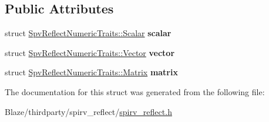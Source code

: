 \subsection*{Public Attributes}
\begin{DoxyCompactItemize}
\item 
\mbox{\label{structSpvReflectNumericTraits_aec2de7c5b32efafa9391e26ebab95ce9}} 
struct \hyperlink{structSpvReflectNumericTraits_1_1Scalar}{Spv\+Reflect\+Numeric\+Traits\+::\+Scalar} {\bfseries scalar}
\item 
\mbox{\label{structSpvReflectNumericTraits_a67f9618ed351699dc8de9e390ee36db1}} 
struct \hyperlink{structSpvReflectNumericTraits_1_1Vector}{Spv\+Reflect\+Numeric\+Traits\+::\+Vector} {\bfseries vector}
\item 
\mbox{\label{structSpvReflectNumericTraits_a1954087da355c8ec3dfe00ea0c4eebce}} 
struct \hyperlink{structSpvReflectNumericTraits_1_1Matrix}{Spv\+Reflect\+Numeric\+Traits\+::\+Matrix} {\bfseries matrix}
\end{DoxyCompactItemize}


The documentation for this struct was generated from the following file\+:\begin{DoxyCompactItemize}
\item 
Blaze/thirdparty/spirv\+\_\+reflect/\hyperlink{spirv__reflect_8h}{spirv\+\_\+reflect.\+h}\end{DoxyCompactItemize}
